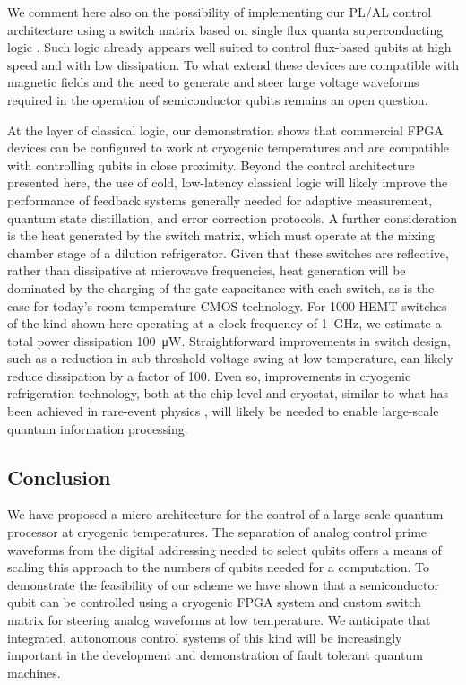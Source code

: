We comment here also on the possibility of implementing our PL/AL control architecture using a switch matrix based on single flux quanta superconducting logic \cite{Johnson_2010}. Such logic already appears well suited to control flux-based qubits at high speed and with low dissipation. To what extend these devices are compatible with magnetic fields and the need to generate and steer large voltage waveforms required in the operation of semiconductor qubits remains an open question.

At the layer of classical logic, our demonstration shows that commercial FPGA devices can be configured to work at cryogenic temperatures and are compatible with controlling qubits in close proximity. Beyond the control architecture presented here, the use of cold, low-latency classical logic will likely improve the performance of feedback systems generally needed for adaptive measurement, quantum state distillation, and error correction protocols.  A further consideration is the heat generated by the switch matrix, which must operate at the mixing chamber stage of a dilution refrigerator. Given that these switches are reflective, rather than dissipative at microwave frequencies, heat generation will be dominated by the charging of the gate capacitance with each switch, as is the case for today's room temperature CMOS technology. For 1000 HEMT switches of the kind shown here operating at a clock frequency of \SI{1}{\giga\hertz}, we estimate a total power dissipation \SI{100}{\micro\watt}. Straightforward improvements in switch design, such as a reduction in sub-threshold voltage swing at low temperature, can likely reduce dissipation by a factor of 100. Even so, improvements in cryogenic refrigeration technology, both at the chip-level \cite{PhysRevApplied.2.054001} and cryostat, similar to what has been achieved in rare-event physics \cite{Schaeffer_2009}, will likely be needed to enable large-scale quantum information processing.


\subsection{Conclusion}
We have proposed a micro-architecture for the control of a large-scale quantum processor at cryogenic temperatures. The separation of analog control prime waveforms from the digital addressing needed to select qubits offers a means of scaling this approach to the numbers of qubits needed for a computation. To demonstrate the feasibility of our scheme we have shown that a semiconductor qubit can be controlled using a cryogenic FPGA system and custom switch matrix for steering analog waveforms at low temperature. We anticipate that integrated, autonomous control systems of this kind will be increasingly important in the development and demonstration of fault tolerant quantum machines.

